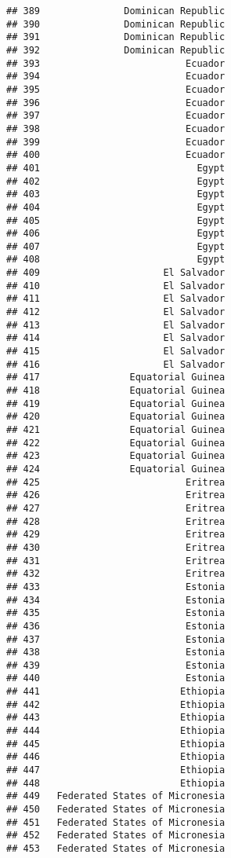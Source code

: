 \documentclass[]{article}
\begin{document}
\begin{verbatim}
## 389               Dominican Republic
## 390               Dominican Republic
## 391               Dominican Republic
## 392               Dominican Republic
## 393                          Ecuador
## 394                          Ecuador
## 395                          Ecuador
## 396                          Ecuador
## 397                          Ecuador
## 398                          Ecuador
## 399                          Ecuador
## 400                          Ecuador
## 401                            Egypt
## 402                            Egypt
## 403                            Egypt
## 404                            Egypt
## 405                            Egypt
## 406                            Egypt
## 407                            Egypt
## 408                            Egypt
## 409                      El Salvador
## 410                      El Salvador
## 411                      El Salvador
## 412                      El Salvador
## 413                      El Salvador
## 414                      El Salvador
## 415                      El Salvador
## 416                      El Salvador
## 417                Equatorial Guinea
## 418                Equatorial Guinea
## 419                Equatorial Guinea
## 420                Equatorial Guinea
## 421                Equatorial Guinea
## 422                Equatorial Guinea
## 423                Equatorial Guinea
## 424                Equatorial Guinea
## 425                          Eritrea
## 426                          Eritrea
## 427                          Eritrea
## 428                          Eritrea
## 429                          Eritrea
## 430                          Eritrea
## 431                          Eritrea
## 432                          Eritrea
## 433                          Estonia
## 434                          Estonia
## 435                          Estonia
## 436                          Estonia
## 437                          Estonia
## 438                          Estonia
## 439                          Estonia
## 440                          Estonia
## 441                         Ethiopia
## 442                         Ethiopia
## 443                         Ethiopia
## 444                         Ethiopia
## 445                         Ethiopia
## 446                         Ethiopia
## 447                         Ethiopia
## 448                         Ethiopia
## 449   Federated States of Micronesia
## 450   Federated States of Micronesia
## 451   Federated States of Micronesia
## 452   Federated States of Micronesia
## 453   Federated States of Micronesia

\end{verbatim}
\end{document}
